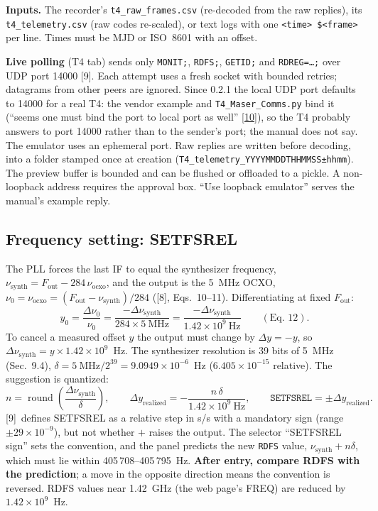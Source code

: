 \documentclass[11pt,a4paper]{article}
\newcommand{\tfourman}{[8]}
\newcommand{\tfournet}{[9]}
\newcommand{\tfoursrc}{\href{https://github.com/Braveheart53/GBO_Maser_Control}{[10]}}
\begin{document}
\textbf{Inputs.} The recorder's \texttt{t4\_raw\_frames.csv} (re-decoded from the raw replies),
its \texttt{t4\_telemetry.csv} (raw codes re-scaled), or text logs with one
\texttt{<time> \$<frame>} per line. Times must be MJD or ISO~8601 with an offset.

\textbf{Live polling} (T4 tab) sends only \texttt{MONIT;}, \texttt{RDFS;}, \texttt{GETID;} and
\texttt{RDREG=\dots;} over UDP port 14000 \tfournet. Each attempt uses a fresh socket with bounded
retries; datagrams from other peers are ignored. Since 0.2.1 the local UDP port defaults to
14000 for a real T4: the vendor example and \texttt{T4\_Maser\_Comms.py} bind it (``seems one
must bind the port to local port as well'' \tfoursrc), so the T4 probably answers to port 14000
rather than to the sender's port; the manual does not say. The emulator uses an ephemeral port. Raw replies are written before decoding, into a
folder stamped once at creation (\texttt{T4\_telemetry\_YYYYMMDDTHHMMSS±hhmm}). The preview buffer
is bounded and can be flushed or offloaded to a pickle. A non-loopback address requires the
approval box. ``Use loopback emulator'' serves the manual's example reply.

\subsection{Frequency setting: SETFSREL}
The PLL forces the last IF to equal the synthesizer frequency, $\nu_{\mathrm{synth}}=F_{\mathrm{out}}-284\,\nu_{\mathrm{ocxo}}$,
and the output is the 5~MHz OCXO, $\nu_0=\nu_{\mathrm{ocxo}}=(F_{\mathrm{out}}-\nu_{\mathrm{synth}})/284$
(\tfourman, Eqs.~10--11). Differentiating at fixed $F_{\mathrm{out}}$:
\[
y_0=\frac{\Delta\nu_0}{\nu_0}=\frac{-\Delta\nu_{\mathrm{synth}}}{284\times5\ \mathrm{MHz}}
=\frac{-\Delta\nu_{\mathrm{synth}}}{1.42\times10^{9}\ \mathrm{Hz}}\qquad(\text{Eq.~12}).
\]
To cancel a measured offset $y$ the output must change by $\Delta y=-y$, so
$\Delta\nu_{\mathrm{synth}}=y\times1.42\times10^{9}$~Hz. The synthesizer resolution is
39 bits of 5~MHz (Sec.~9.4), $\delta=5\ \mathrm{MHz}/2^{39}=9.0949\times10^{-6}$~Hz
($6.405\times10^{-15}$ relative). The suggestion is quantized:
\[
n=\operatorname{round}\!\left(\frac{\Delta\nu_{\mathrm{synth}}}{\delta}\right),\qquad
\Delta y_{\mathrm{realized}}=-\frac{n\,\delta}{1.42\times10^{9}\ \mathrm{Hz}},\qquad
\texttt{SETFSREL}=\pm\Delta y_{\mathrm{realized}} .
\]
\tfournet\ defines SETFSREL as a relative step in s/s with a mandatory sign (range
$\pm29\times10^{-9}$), but not whether $+$ raises the output. The selector
``SETFSREL sign'' sets the convention, and the panel predicts the new \texttt{RDFS} value,
$\nu_{\mathrm{synth}}+n\delta$, which must lie within 405\,708--405\,795~Hz. \textbf{After entry, compare
RDFS with the prediction}; a move in the opposite direction means the convention is
reversed. RDFS values near 1.42~GHz (the web page's FREQ) are reduced by $1.42\times10^9$~Hz.
\end{document}
